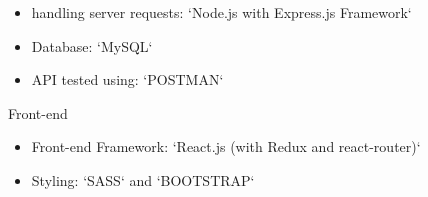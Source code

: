 \documentclass[12pt]{article}
\begin{document}
\begin{itemize}
	\item handling server requests: `Node.js with Express.js Framework`
	\item Database: `MySQL`
 \item API tested using: `POSTMAN`

\end{itemize} 

\begin{large}
	\hspace{-0.7cm} Front-end
\end{large}

\begin{itemize}
\item Front-end Framework: `React.js (with Redux and react-router)`
\item Styling: `SASS` and `BOOTSTRAP`

\end{itemize} 
\end{document}
